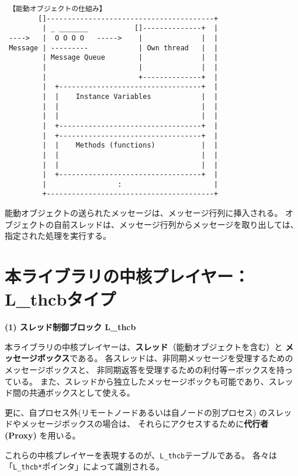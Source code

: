 {\small\begin{verbatim}
 【能動オブジェクトの仕組み】
        []----------------------------------------+
         | _ _______           []--------------+  |
 ---->   |  O O O O   ----->    |              |  |
 Message | ---------            | Own thread   |  |
         | Message Queue        |              |  |
         |                      |              |  |
         |                      +--------------+  |
         |  +----------------------------------+  |
         |  |    Instance Variables            |  |
         |  |                                  |  |
         |  |                                  |  |
         |  +----------------------------------+  |
         |  +----------------------------------+  |
         |  |    Methods (functions)           |  |
         |  |                                  |  |
         |  |                                  |  |
         |  +----------------------------------+  |
         |                 :                      |
         +----------------------------------------+
\end{verbatim}}

能動オブジェクトの送られたメッセージは、メッセージ行列に挿入される。
オブジェクトの自前スレッドは、メッセージ行列からメッセージを取り出しては、
指定された処理を実行する。


\section{本ライブラリの中核プレイヤー： L\_thcbタイプ}

{\flushleft\bf (1) スレッド制御ブロック  L\_thcb}

本ライブラリの中核プレイヤーは、{\bf スレッド}（能動オブジェクトを含む）と
{\bf メッセージボックス}である。
各スレッドは、非同期メッセージを受理するためのメッセージボックスと、
非同期返答を受理するための利付等ーボックスを持っている。
また、スレッドから独立したメッセージボックも可能であり、スレッド間の共通ボックスとして使える。

更に、自プロセス外(リモートノードあるいは自ノードの別プロセス)
のスレッドやメッセージボックスの場合は、
それらにアクセスするために{\bf 代行者(Proxy)} を用いる。

これらの中核プレイヤーを表現するのが、\verb|L_thcb|テーブルである。
各々は「\verb|L_thcb*|ポインタ」によって識別される。

